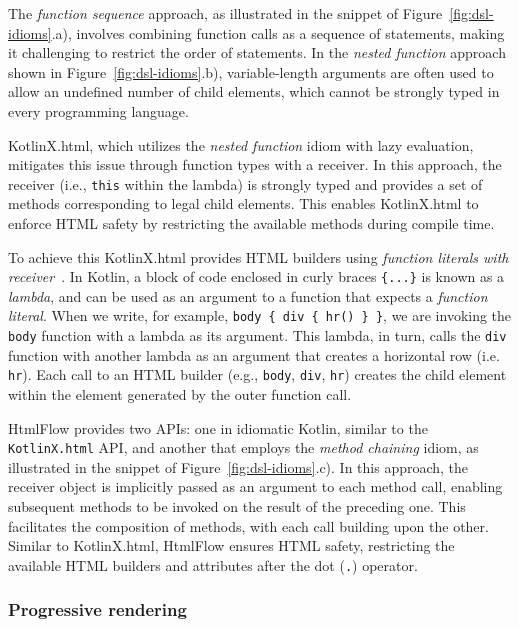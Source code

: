 The \textit{function sequence} approach, as illustrated in the snippet of
Figure~\ref{fig:dsl-idioms}.a), involves combining function calls as a sequence of
statements, making it challenging to restrict the order of statements. 
In the \textit{nested function} approach shown in
Figure~\ref{fig:dsl-idioms}.b), variable-length arguments are often used to
allow an undefined number of child elements, which cannot be strongly typed in
every programming language.

KotlinX.html, which utilizes the \textit{nested function} idiom with lazy
evaluation, mitigates this issue through function types with a receiver. 
In this approach, the receiver (i.e., \texttt{this} within the lambda) is
strongly typed and provides a set of methods corresponding to legal child
elements.
This enables KotlinX.html to enforce HTML safety by restricting the available
methods during compile time.

To achieve this KotlinX.html provides HTML builders using \textit{function
literals with receiver}~\cite{kotlinlang}.
In Kotlin, a block of code enclosed in curly braces \texttt{\{...\}} is known as
a \emph{lambda}, and can be used as an argument to
a function that expects a \emph{function literal}.
When we write, for example, \texttt{body \{ div \{ hr() \} \}}, we are
invoking the \texttt{body} function with a lambda as its argument. This
lambda, in turn, calls the \texttt{div} function with another lambda as an
argument that creates a horizontal row (i.e. \texttt{hr}).
Each call to an HTML builder (e.g., \texttt{body}, \texttt{div}, \texttt{hr})
creates the child element within the element generated by the outer function
call.

HtmlFlow provides two APIs: one in idiomatic Kotlin, similar to the \texttt{KotlinX.html} 
API, and another that employs the \textit{method chaining} idiom, as illustrated 
in the snippet of Figure~\ref{fig:dsl-idioms}.c).
In this approach, the receiver object is implicitly passed as an argument to
each method call, enabling subsequent methods to be invoked on the result of the
preceding one.
This facilitates the composition of methods, with each call building upon the
other.
Similar to KotlinX.html, HtmlFlow ensures HTML safety, restricting the available
HTML builders and attributes after the dot (\texttt{.}) operator.


\subsubsection{Progressive rendering}
